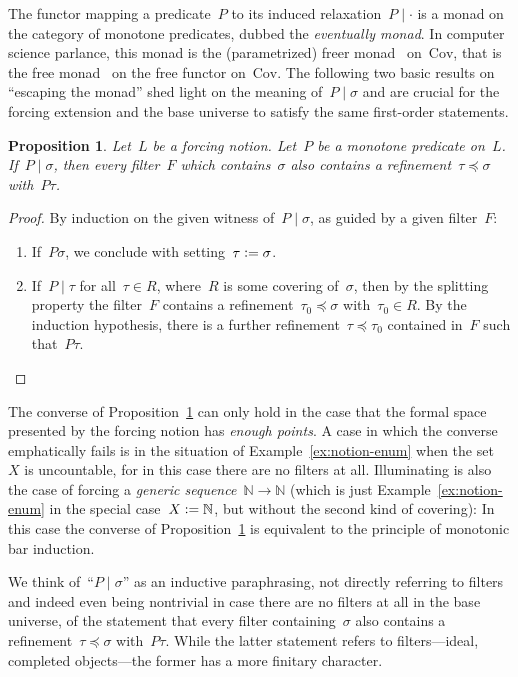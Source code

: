 \documentclass[com,11pt,crcready]{iosart2x}
\theoremstyle{definition}
\theoremstyle{plain}
\newtheorem{proposition}[definition]{Proposition}
\theoremstyle{remark}
\newcommand{\?}{\,{:}\,}
\newcommand{\NN}{\mathbb{N}}
\newcommand{\defeq}{\vcentcolon=}
\newcommand{\Cov}{\mathrm{Cov}}
\renewcommand{\_}{\mathpunct{.}\,}
\begin{document}
The functor mapping a predicate~$P$ to its induced
relaxation~$P\mid\cdot$ is a monad on the category of monotone predicates, dubbed the
\emph{eventually monad}. In computer science parlance, this monad is
the (parametrized) freer monad~\cite{kiselyov-ishii:freer,apfelmus:operational}
on~$\Cov$, that is the free monad~\cite[Section~6]{swierstra:carte}
on the free functor on~$\Cov$.
%
The following two basic results on ``escaping the monad'' shed light on the
meaning of~$P \mid \sigma$ and are crucial for the forcing extension and the
base universe to satisfy the same first-order statements.

\begin{proposition}\label{prop:ev-points}Let~$L$ be a forcing notion. Let~$P$
be a monotone predicate on~$L$. If~$P \mid \sigma$, then every filter~$F$ which
contains~$\sigma$ also contains a refinement~$\tau \preceq \sigma$
with~$P\tau$.
\end{proposition}

\begin{proof}By induction on the given witness of~$P \mid \sigma$, as guided by
a given filter~$F$:
\begin{enumerate}
\item If~$P\sigma$, we conclude with setting~$\tau \defeq \sigma$.
\item If~$P \mid \tau$ for all~$\tau \in R$, where~$R$ is some covering
of~$\sigma$, then by the splitting property the filter~$F$ contains a refinement~$\tau_0
\preceq \sigma$ with~$\tau_0 \in R$. By the induction hypothesis, there is a
further refinement~$\tau \preceq \tau_0$ contained in~$F$ such that~$P\tau$.\qedhere
\end{enumerate}
\end{proof}

The converse of Proposition~\ref{prop:ev-points} can only hold in the case that
the formal space presented by the forcing notion has \emph{enough points}.
A case in which the converse emphatically fails is in the situation of
Example~\ref{ex:notion-enum} when the set~$X$ is uncountable, for in this case
there are no filters at all. Illuminating is also the case of forcing a
\emph{generic sequence}~$\NN \to \NN$ (which is just
Example~\ref{ex:notion-enum} in the special case~$X \defeq \NN$, but without
the second kind of covering): In this case the converse of
Proposition~\ref{prop:ev-points} is equivalent to the principle of monotonic
bar induction.

We think of~``$P \mid \sigma$'' as an inductive paraphrasing, not directly referring to
filters and indeed even being nontrivial in case there are no filters at all in the base
universe, of the statement that every filter containing~$\sigma$ also contains
a refinement~$\tau \preceq \sigma$ with~$P\tau$. While the latter statement
refers to filters---ideal, completed objects---the former has a more finitary
character.
\end{document}

